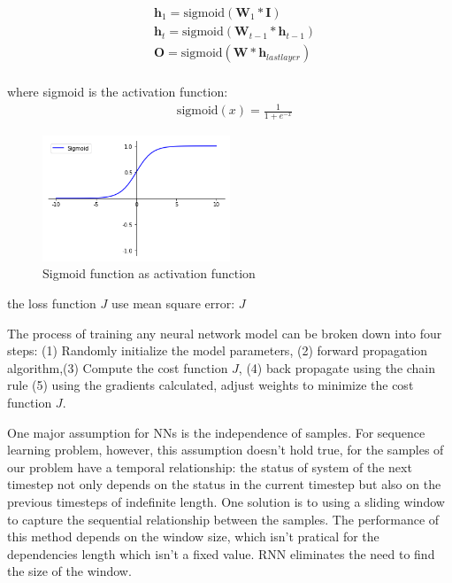 \documentclass[5p]{elsarticle}
\begin{document}
\begin{equation}
    \begin{split}
    & \mathbf h_1 = \text{sigmoid}(\mathbf W_1 * \mathbf I) \\
    & \mathbf h_t = \text{sigmoid}(\mathbf W_{t-1} * \mathbf h_{t-1}) \\
    & \mathbf O=\text{sigmoid}(\mathbf W * \mathbf h_{lastlayer}) \\
    \end{split}
\end{equation}

where sigmoid is the activation function:
\begin{equation}
    \begin{split}
    & \text{sigmoid}(x)=\frac{1}{1+e^{-x}}
    \end{split}
\end{equation}

\begin{figure}[h]
    \centering
    \includegraphics[width=0.5\textwidth]{sigmoid.png}
    \caption{Sigmoid function as activation function}
    \label{fig:sigmoid}
\end{figure}

the loss function $J$ use mean square error:
    $J$

The process of training any neural network model can be broken down into four steps: (1) Randomly initialize the model parameters, (2) forward propagation algorithm,(3) Compute the cost function $J$, (4) back propagate using the chain rule  (5) using the gradients calculated, adjust weights to minimize the cost function $J$.

One major assumption for NNs is the independence of samples. For sequence learning problem, however, this assumption doesn't hold true, for the samples of our problem have a temporal relationship: the status of system of the next timestep not only depends on the status in the current timestep but also on the previous timesteps of indefinite length. One solution is to using a sliding window to capture the sequential relationship between the samples. The performance of this method depends on the window size, which isn't pratical for the dependencies length which isn't a fixed value. RNN eliminates the need to find the size of the window\cite{HermansTrainingNetworks}. 
\end{document}
